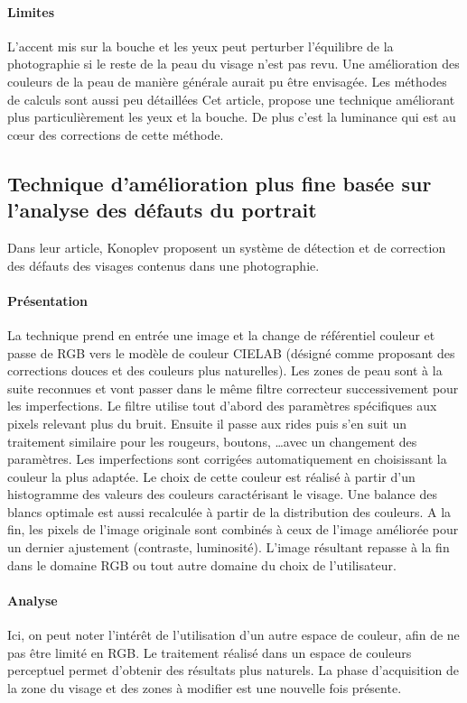 \documentclass[11pt, french,screen]{report-rd-info}
\begin{document}
\paragraph{Limites}
L’accent mis sur la bouche et les yeux peut perturber l’équilibre de la photographie si le reste de la peau du visage n’est pas revu. Une amélioration des couleurs de la peau de manière générale aurait pu être envisagée. Les méthodes de calculs sont aussi peu détaillées
Cet article, propose une technique améliorant plus particulièrement les yeux et la bouche. De plus c’est la luminance qui est au cœur des corrections de cette méthode.
\subsection{Technique d’amélioration plus fine basée sur l’analyse des défauts du portrait}
Dans leur article, Konoplev\cite{Konoplev2012} proposent un système de détection et de correction des défauts des visages contenus dans une photographie.
\paragraph{Présentation}
La technique prend en entrée une image et la change de référentiel couleur et passe de RGB vers le modèle de couleur CIELAB (désigné comme proposant des corrections douces et des couleurs plus naturelles). Les zones de peau sont à la suite reconnues et vont passer dans le même filtre correcteur successivement pour les imperfections. Le filtre utilise tout d'abord des paramètres spécifiques aux pixels relevant plus du bruit. Ensuite il passe aux rides puis s'en suit un traitement similaire pour les rougeurs, boutons, \ldots avec un changement des paramètres. Les imperfections sont corrigées automatiquement en choisissant la couleur la plus adaptée. Le choix de cette couleur est réalisé à partir d’un histogramme des valeurs des couleurs caractérisant le visage. Une balance des blancs optimale est aussi recalculée à partir de la distribution des couleurs. A la fin, les pixels de l’image originale sont combinés à ceux de l’image améliorée pour un dernier ajustement (contraste, luminosité). L'image résultant repasse à la fin dans le domaine RGB ou tout autre domaine du choix de l’utilisateur.
\paragraph{Analyse}
Ici, on peut noter l'intérêt de l'utilisation d'un autre espace de couleur, afin de ne pas être limité en RGB. Le traitement réalisé dans un espace de couleurs perceptuel permet d'obtenir des résultats plus naturels. La phase d'acquisition de la zone du visage et des zones à modifier est une nouvelle fois présente.
\end{document}
